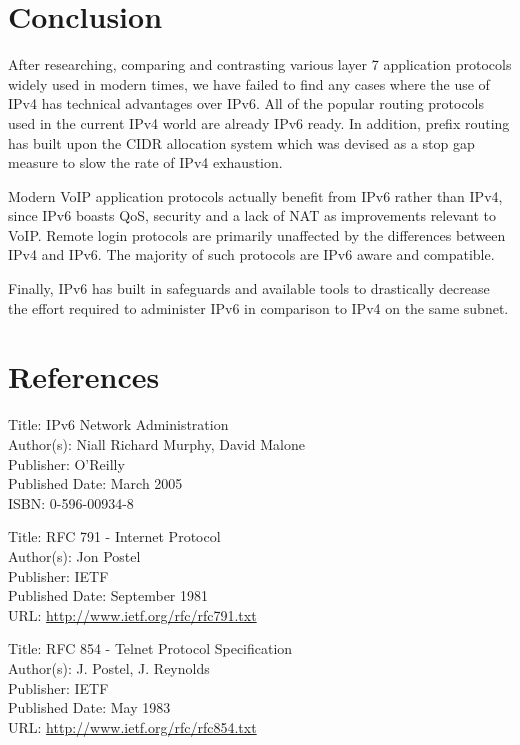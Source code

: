 \documentclass[a4paper,12pt]{article}
\begin{document}
\section{Conclusion}

After researching, comparing and contrasting various layer 7 application
protocols widely used in modern times, we have failed to find any cases
where the use of IPv4 has technical advantages over IPv6. All of the
popular routing protocols used in the current IPv4 world are already
IPv6 ready. In addition, prefix routing has built upon the CIDR
allocation system which was devised as a stop gap measure to slow the 
rate of IPv4 exhaustion.


Modern VoIP application protocols actually benefit from IPv6 rather than
IPv4, since IPv6 boasts QoS, security and a lack of NAT as improvements
relevant to VoIP. Remote login protocols are primarily unaffected by the
differences between IPv4 and IPv6. The majority of such protocols are
IPv6 aware and compatible.


Finally, IPv6 has built in safeguards and available tools to drastically
decrease the effort required to administer IPv6 in comparison
to IPv4 on the same subnet.

\section{References}

Title: IPv6 Network Administration \\
Author(s): Niall Richard Murphy, David Malone \\
Publisher: O'Reilly \\
Published Date: March 2005  \\
ISBN: 0-596-00934-8	 

Title: RFC 791 - Internet Protocol \\
Author(s): Jon Postel \\
Publisher: IETF \\
Published Date: September 1981 \\
URL: \url{http://www.ietf.org/rfc/rfc791.txt}	 

Title: RFC 854 - Telnet Protocol Specification \\
Author(s): J. Postel, J. Reynolds \\
Publisher: IETF \\
Published Date: May 1983 \\
URL: \url{http://www.ietf.org/rfc/rfc854.txt}	 
\end{document}
